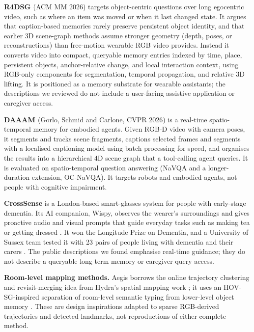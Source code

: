 \textbf{R4DSG \cite{r4dsg2026}} (ACM MM 2026) targets object-centric questions
over long egocentric video, such as where an item was moved or when it last
changed state. It argues that caption-based memories rarely preserve persistent
object identity, and that earlier 3D scene-graph methods assume stronger
geometry (depth, poses, or reconstructions) than free-motion wearable RGB video
provides. Instead it converts video into compact, queryable memory entries
indexed by time, place, persistent objects, anchor-relative change, and local
interaction context, using RGB-only components for segmentation, temporal
propagation, and relative 3D lifting. It is positioned as a memory substrate
for wearable assistants; the descriptions we reviewed do not include a
user-facing assistive application or caregiver access.

\textbf{DAAAM \cite{daaam2026}} (Gorlo, Schmid and Carlone, CVPR 2026) is a
real-time spatio-temporal memory for embodied agents. Given RGB-D video with
camera poses, it segments and tracks scene fragments, captions selected frames
and segments with a localised captioning model using batch processing for
speed, and organises the results into a hierarchical 4D scene graph that a
tool-calling agent queries. It is evaluated on spatio-temporal question
answering (NaVQA and a longer-duration extension, OC-NaVQA). It targets robots
and embodied agents, not people with cognitive impairment.

\textbf{CrossSense} is a London-based smart-glasses system for people with
early-stage dementia. Its AI companion, Wispy, observes the wearer's
surroundings and gives proactive audio and visual prompts that guide everyday
tasks such as making tea or getting dressed
\cite{crosssense-techradar,crosssense-bigissue}. It won the Longitude Prize on
Dementia, and a University of Sussex team tested it with 23 pairs of people
living with dementia and their carers \cite{crosssense-bigissue}. The public
descriptions we found emphasise real-time guidance; they do not describe a
queryable long-term memory or caregiver query access. 

\textbf{Room-level mapping methods.} Aegis borrows the online trajectory clustering and revisit-merging idea from Hydra's spatial mapping work \cite{hydra2022}; it uses an HOV-SG-inspired separation of room-level semantic typing from lower-level object memory \cite{hovsg2024}. These are design inspirations adapted to sparse RGB-derived trajectories and detected landmarks, not reproductions of either complete method.

